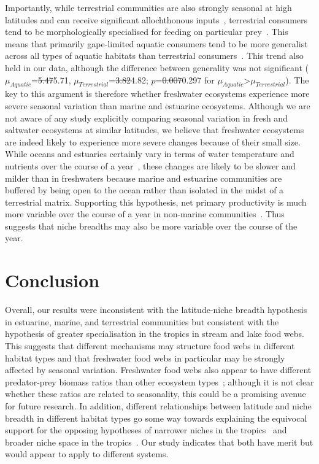 \documentclass[12pt]{article}
\begin{document}
  Importantly, while terrestrial communities are also strongly seasonal at
  high latitudes and can receive significant allochthonous
  inputs~\cite{Nakano2001}, terrestrial consumers tend to be
  morphologically specialised for feeding on particular prey~\cite{Liem1990}.
  This means that primarily gape-limited aquatic consumers tend to be more
  generalist across all types of aquatic habitats than terrestrial 
  consumers~\cite{Liem1990,Shurin2006}. This trend also held in our data, although the difference between generality was not significant (
  $\mu_{Aquatic}$=\st{5.47}5.71, $\mu_{Terrestrial}$=\st{3.82}4.82; $p$=\st{0.007}0.297 for $\mu_{Aquatic}$\textgreater$\mu_{Terrestrial}$). 
  The key to this argument is therefore whether freshwater ecosystems experience
  more severe seasonal variation than marine and estuarine ecosystems. Although
  we are not aware of any study explicitly comparing seasonal variation in
  fresh and saltwater ecosystems at similar latitudes, we believe that freshwater 
  ecosystems are indeed likely to experience more severe changes because of their small size.
  While oceans and estuaries certainly vary in terms of water temperature and
  nutrients over the course of a year~\cite{Baird1989}, these changes are likely to be slower
  and milder than in freshwaters because marine and estuarine communities are buffered 
  by being open to the ocean rather than isolated in the midst of a terrestrial matrix. 
  Supporting this hypothesis, net primary productivity is much more variable over the course of a year 
  in non-marine communities~\cite{Field1998}. Thus suggests that niche breadths may also be 
  more variable over the course of the year. 


\section*{Conclusion}

  Overall, our results were inconsistent with the latitude-niche breadth
  hypothesis in estuarine, marine, and terrestrial communities but consistent
  with the hypothesis of greater specialisation in the tropics in stream and
  lake food webs. This suggests that different mechanisms may structure food
  webs in different habitat types and that freshwater food webs in particular
  may be strongly affected by seasonal variation. Freshwater food webs also
  appear to have different predator-prey biomass ratios than other ecosystem
  types~\cite{Riede2011}; although it is not clear whether these ratios are related
  to seasonality, this could be a promising avenue for future research. In addition, different
  relationships between latitude and niche breadth in different habitat types
  go some way towards explaining the equivocal support for the opposing
  hypotheses of narrower niches in the tropics~\cite{Vazquez2004} and broader
  niche space in the tropics~\cite{Davies2007}. Our study indicates that both 
  have merit but would appear to apply to different systems.
\end{document}
